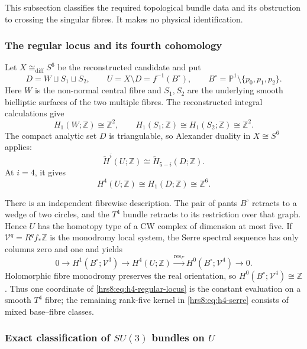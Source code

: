 This subsection classifies the required topological bundle data and its
obstruction to crossing the singular fibres.  It makes no physical
identification.

\subsubsection{The regular locus and its fourth cohomology}
\label{hrs8:subsubsec:regular-cohomology}

Let $X\cong_{\mathrm{diff}}S^6$ be the reconstructed candidate and put
\[
 D=W\sqcup S_1\sqcup S_2,
 \qquad U=X\setminus D=f^{-1}(B^\circ),
 \qquad B^\circ=\mathbb P^1\setminus\{p_0,p_1,p_2\}.
\]
Here $W$ is the non-normal central fibre and $S_1,S_2$ are the underlying
smooth bielliptic surfaces of the two multiple fibres.  The reconstructed
integral calculations give
\[
 H_1(W;\mathbb Z)\cong\mathbb Z^2,
 \qquad H_1(S_1;\mathbb Z)\cong H_1(S_2;\mathbb Z)\cong\mathbb Z^2.
\]
The compact analytic set $D$ is triangulable, so Alexander duality in
$X\cong S^6$ applies:
\[
 \widetilde H^i(U;\mathbb Z)
 \cong\widetilde H_{5-i}(D;\mathbb Z).
\]
At $i=4$, it gives
\begin{equation}
 \boxed{H^4(U;\mathbb Z)\cong H_1(D;\mathbb Z)\cong\mathbb Z^6.}
 \label{hrs8:eq:h4-regular-locus}
\end{equation}

There is an independent fibrewise description.  The pair of pants
$B^\circ$ retracts to a wedge of two circles, and the $T^4$ bundle retracts
to its restriction over that graph.  Hence $U$ has the homotopy type of a CW
complex of dimension at most five.  If $\mathcal V^q=R^qf_*\mathbb Z$ is the
monodromy local system, the Serre spectral sequence has only columns zero and
one and yields
\begin{equation}
 0\longrightarrow H^1(B^\circ;\mathcal V^3)
 \longrightarrow H^4(U;\mathbb Z)
 \xrightarrow{\operatorname{res}_F}
 H^0(B^\circ;\mathcal V^4)
 \longrightarrow0.
 \label{hrs8:eq:h4-serre}
\end{equation}
Holomorphic fibre monodromy preserves the real orientation, so
$H^0(B^\circ;\mathcal V^4)\cong\mathbb Z$.  Thus one coordinate of
\eqref{hrs8:eq:h4-regular-locus} is the constant evaluation on a smooth
$T^4$ fibre; the remaining rank-five kernel in \eqref{hrs8:eq:h4-serre}
consists of mixed base--fibre classes.

\subsubsection{Exact classification of \texorpdfstring{$SU(3)$}{SU(3)} bundles on \texorpdfstring{$U$}{U}}
\label{hrs8:subsubsec:su3-classification}

